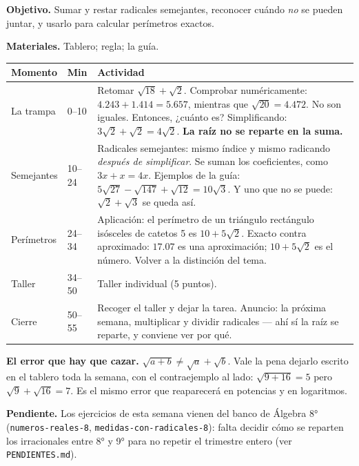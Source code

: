 \documentclass[11pt]{article}
\begin{document}

\textbf{Objetivo.} Sumar y restar radicales semejantes, reconocer cuándo \emph{no} se pueden
juntar, y usarlo para calcular perímetros exactos.

\textbf{Materiales.} Tablero; regla; la guía.

\begin{center}
{\renewcommand{\arraystretch}{1.3}
\begin{tabularx}{\linewidth}{@{}l l X@{}}
  \toprule
  \textbf{Momento} & \textbf{Min} & \textbf{Actividad}\\
  \midrule
  La trampa & 0--10 & Retomar $\sqrt{18} + \sqrt{2}$. Comprobar numéricamente:
    $\num{4,243} + \num{1,414} = \num{5,657}$, mientras que $\sqrt{20} = \num{4,472}$. No
    son iguales. Entonces, ¿cuánto es? Simplificando: $3\sqrt{2} + \sqrt{2} = 4\sqrt{2}$.
    \textbf{La raíz no se reparte en la suma.}\\
  Semejantes & 10--24 & Radicales semejantes: mismo índice y mismo radicando \emph{después
    de simplificar}. Se suman los coeficientes, como $3x + x = 4x$. Ejemplos de la guía:
    $5\sqrt{27} - \sqrt{147} + \sqrt{12} = 10\sqrt{3}$. Y uno que no se puede:
    $\sqrt{2} + \sqrt{3}$ se queda así.\\
  Perímetros & 24--34 & Aplicación: el perímetro de un triángulo rectángulo isósceles de
    catetos 5 es $10 + 5\sqrt{2}$. Exacto contra aproximado: $\num{17,07}$ es una
    aproximación; $10 + 5\sqrt{2}$ es el número. Volver a la distinción del tema.\\
  Taller & 34--50 & Taller individual (5 puntos).\\
  Cierre & 50--55 & Recoger el taller y dejar la tarea. Anuncio: la próxima semana,
    multiplicar y dividir radicales — ahí sí la raíz se reparte, y conviene ver por qué.\\
  \bottomrule
\end{tabularx}}
\end{center}

\begin{nota}
\textbf{El error que hay que cazar.} $\sqrt{a + b} \neq \sqrt{a} + \sqrt{b}$. Vale la pena
dejarlo escrito en el tablero toda la semana, con el contraejemplo al lado:
$\sqrt{9 + 16} = 5$ pero $\sqrt{9} + \sqrt{16} = 7$. Es el mismo error que reaparecerá en
potencias y en logaritmos.
\end{nota}

\begin{nota}
\textbf{Pendiente.} Los ejercicios de esta semana vienen del banco de Álgebra 8°
(\texttt{numeros-reales-8}, \texttt{medidas-con-radicales-8}): falta decidir cómo se reparten
los irracionales entre 8° y 9° para no repetir el trimestre entero (ver \texttt{PENDIENTES.md}).
\end{nota}
\end{document}
